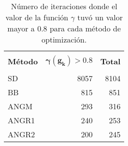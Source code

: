 \begin{table}[H]
    \centering
    \begin{tabular}{lrr}
        \hline                                                            \\
        \textbf{Método} & $\boldsymbol{\gamma(g_k)>0.8}$ & \textbf{Total} \\[0.25cm]  \hline
        \\
        SD              & 8057                           & 8104           \\[0.25cm]
        BB              & 815                            & 851            \\[0.25cm]
        ANGM            & 293                            & 316            \\[0.25cm]
        ANGR1           & 240                            & 253            \\[0.25cm]
        ANGR2           & 200                            & 245            \\[0.25cm] \hline
    \end{tabular}
    \caption{Número de iteraciones donde el valor de la función $\gamma$ tuvó un valor mayor a 0.8 para cada método de optimización.}
    \label{table:gamma_function}
\end{table}